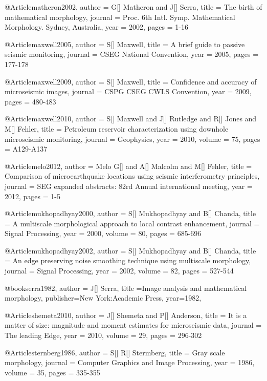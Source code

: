   
  
      @Article{matheron2002,
  author = 	 {G[] Matheron and J[] Serra},
  title = 	 {The birth of mathematical morphology},
  journal = 	 {Proc. 6th Intl. Symp.
Mathematical Morphology. Sydney, Australia},
  year = 	 2002,
  pages = 	 {1-16}}   

     @Article{maxwell2005,
  author = 	 {S[] Maxwell},
  title = 	 {A brief guide to passive seismic monitoring},
  journal = 	 {CSEG National Convention},
  year = 	 2005,
  pages = 	 {177-178}}   
  
     @Article{maxwell2009,
  author = 	 {S[] Maxwell},
  title = 	 {Confidence and accuracy of microseismic images},
  journal = 	 {CSPG CSEG CWLS Convention},
  year = 	 2009,
  pages = 	 {480-483}}   
  
    
     @Article{maxwell2010,
  author = 	 {S[] Maxwell and J[] Rutledge and R[] Jones and M[] Fehler},
  title = 	 {Petroleum reservoir characterization using downhole microseismic monitoring},
  journal = 	 {Geophysics},
  year = 	 2010,
  volume = 	 75,
  pages = 	 {A129-A137}}  


     @Article{melo2012,
  author = 	 {Melo G[] and A[] Malcolm and M[] Fehler},
  title = 	 {Comparison of microearthquake locations using seismic interferometry principles},
  journal = 	 {SEG expanded abstracts: 82rd Annual international meeting},
  year = 	 2012,
  pages = 	 {1-5}}  
  
      @Article{mukhopadhyay2000,
  author = 	 {S[] Mukhopadhyay and B[] Chanda},
  title = 	 {A multiscale morphological approach to local contrast enhancement},
  journal = 	 {Signal Processing},
  year = 	 2000,
  volume = 	 80,
  pages = 	 {685-696}} 


      @Article{mukhopadhyay2002,
  author = 	 {S[] Mukhopadhyay and B[] Chanda},
  title = 	 {An edge preserving noise smoothing technique using
multiscale morphology},
  journal = 	 {Signal Processing},
  year = 	 2002,
  volume = 	 82,
  pages = 	 {527-544}} 
  
  
@book{serra1982,
  author = {J[] Serra},
  title ={Image analysis and mathematical morphology},
  publisher={New York:Academic Press},
  year=1982,
}

       @Article{shemeta2010,
  author = 	 {J[] Shemeta and P[] Anderson},
  title = 	 {It is a matter of size: magnitude and moment estimates for microseismic data},
  journal = 	 {The leading Edge},
  year = 	 2010,
  volume = 	 29,
  pages = 	 {296-302}} 
  
         @Article{sternberg1986,
  author = 	 {S[] R[] Stermberg},
  title = 	 {Gray scale morphology},
  journal = 	 {Computer Graphics and Image Processing},
  year = 	 1986,
  volume = 	 35,
  pages = 	 {335-355}}  
  
